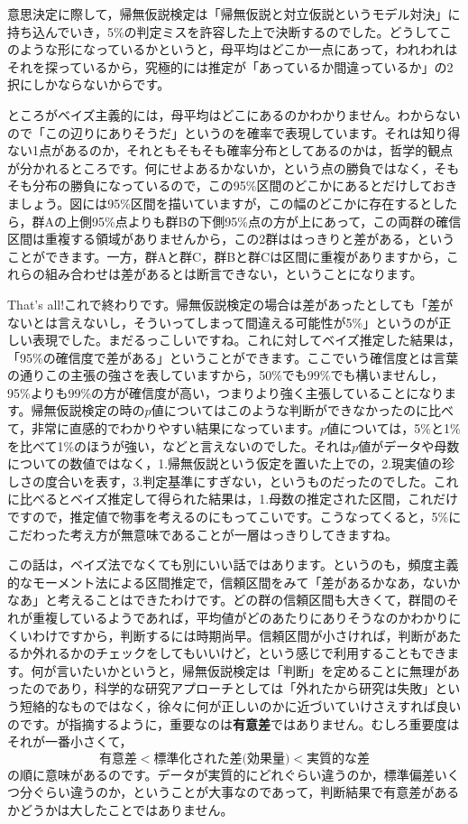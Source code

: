 \documentclass{ltjbook}
\begin{document}
意思決定に際して，帰無仮説検定は「帰無仮説と対立仮説というモデル対決」に持ち込んでいき，5\%の判定ミスを許容した上で決断するのでした。どうしてこのような形になっているかというと，母平均はどこか一点にあって，われわれはそれを探っているから，究極的には推定が「あっているか間違っているか」の2択にしかならないからです。

ところがベイズ主義的には，母平均はどこにあるのかわかりません。わからないので「この辺りにありそうだ」というのを確率で表現しています。それは知り得ない1点があるのか，それともそもそも確率分布としてあるのかは，哲学的観点が分かれるところです。何にせよあるかないか，という点の勝負ではなく，そもそも分布の勝負になっているので，この95\%区間のどこかにあるとだけしておきましょう。図には95\%区間を描いていますが，この幅のどこかに存在するとしたら，群Aの上側95\%点よりも群Bの下側95\%点の方が上にあって，この両群の確信区間は重複する領域がありませんから，この2群ははっきりと差がある，ということができます。一方，群Aと群C，群Bと群Cは区間に重複がありますから，これらの組み合わせは差があるとは断言できない，ということになります。

That's all!これで終わりです。帰無仮説検定の場合は差があったとしても「差がないとは言えないし，そういってしまって間違える可能性が5\%」というのが正しい表現でした。まだるっこしいですね。これに対してベイズ推定した結果は，「95\%の確信度で差がある」ということができます。ここでいう確信度とは言葉の通りこの主張の強さを表していますから，50\%でも99\%でも構いませんし，95\%よりも99\%の方が確信度が高い，つまりより強く主張していることになります。帰無仮説検定の時の$p$値についてはこのような判断ができなかったのに比べて，非常に直感的でわかりやすい結果になっています。$p$値については，5\%と1\%を比べて1\%のほうが強い，などと言えないのでした。それは$p$値がデータや母数についての数値ではなく，1.帰無仮説という仮定を置いた上での，2.現実値の珍しさの度合いを表す，3.判定基準にすぎない，というものだったのでした。これに比べるとベイズ推定して得られた結果は，1.母数の推定された区間，これだけですので，推定値で物事を考えるのにもってこいです。こうなってくると，5\%にこだわった考え方が無意味であることが一層はっきりしてきますね。

この話は，ベイズ法でなくても別にいい話ではあります。というのも，頻度主義的なモーメント法による区間推定で，信頼区間をみて「差があるかなあ，ないかなあ」と考えることはできたわけです。どの群の信頼区間も大きくて，群間のそれが重複しているようであれば，平均値がどのあたりにありそうなのかわかりにくいわけですから，判断するには時期尚早。信頼区間が小さければ，判断があたるか外れるかのチェックをしてもいいけど，という感じで利用することもできます。何が言いたいかというと，帰無仮説検定は「判断」を定めることに無理があったのであり，科学的な研究アプローチとしては「外れたから研究は失敗」という短絡的なものではなく，徐々に何が正しいのかに近づいていけさえすれば良いのです。\textcite{Toyoda2009}が指摘するように，重要なのは\textbf{有意差}ではありません。むしろ重要度はそれが一番小さくて，
\[ \mbox{有意差} < \mbox{標準化された差(効果量)} < \mbox{実質的な差} \]
の順に意味があるのです。データが実質的にどれぐらい違うのか，標準偏差いくつ分ぐらい違うのか，ということが大事なのであって，判断結果で有意差があるかどうかは大したことではありません。
\end{document}
